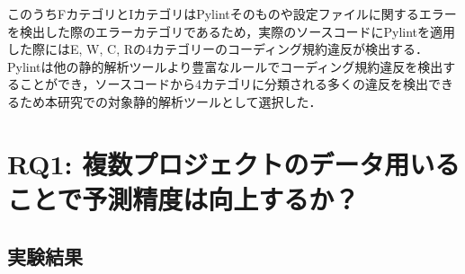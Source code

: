 \documentclass[11pt,dvipdfmx]{jreport}
\begin{document}
このうちFカテゴリとIカテゴリはPylintそのものや設定ファイルに関するエラーを検出した際のエラーカテゴリであるため，実際のソースコードにPylintを適用した際にはE, W, C, Rの4カテゴリーのコーディング規約違反が検出する．Pylintは他の静的解析ツールより豊富なルールでコーディング規約違反を検出することができ，ソースコードから4カテゴリに分類される多くの違反を検出できるため本研究での対象静的解析ツールとして選択した．

\section{RQ1: 複数プロジェクトのデータ用いることで予測精度は向上するか？}

\subsection{実験結果}
\end{document}
